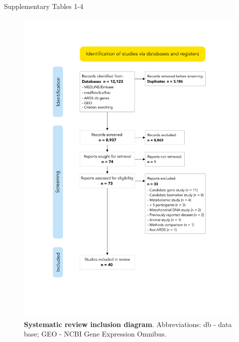 \documentclass[
  11,
  a4paper,
]{article}
\begin{document}
Supplementary Tables 1-4

\begin{figure}[H]

{\centering \includegraphics{../img/Supplementary_Figure_1.png}

}

\caption{\textbf{Systematic review inclusion diagram}. Abbreviations: db
- data base; GEO - NCBI Gene Expression Omnibus.}

\end{figure}%
\end{document}

